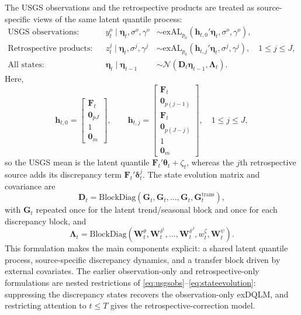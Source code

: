 \documentclass[APA,STIX1COL]{WileyNJD-v2}
\begin{document}
The USGS observations and the retrospective products are treated as source-specific views of the same latent quantile process:
\begin{align}
     \text{USGS observations}:&& y^o_t \mid \boldsymbol{\eta}_t, \sigma^o, \gamma^o &\sim \text{exAL}_{p_0}\!\left(\mathbf{h}_{t,0}' \boldsymbol{\eta}_t, \sigma^o, \gamma^o\right), \label{eq:usgsobs} \\
    \text{Retrospective products}:&& z^j_t \mid \boldsymbol{\eta}_t, \sigma^j, \gamma^j &\sim \text{exAL}_{p_0}\!\left(\mathbf{h}_{t,j}' \boldsymbol{\eta}_t, \sigma^j, \gamma^j\right), \quad 1 \leq j \leq J, \label{eq:retroobs} \\
    \text{All states}:&& \boldsymbol{\eta}_t \mid \boldsymbol{\eta}_{t-1} &\sim \mathcal{N}\!\left(\boldsymbol{D}_t \boldsymbol{\eta}_{t-1}, \boldsymbol{\Lambda}_t\right). \label{eq:stateevolution}
\end{align}
Here,
\[
\mathbf{h}_{t,0} =
\begin{bmatrix}
\mathbf{F}_t \\
\mathbf{0}_{pJ} \\
1 \\
\mathbf{0}_m
\end{bmatrix},
\qquad
\mathbf{h}_{t,j} =
\begin{bmatrix}
\mathbf{F}_t \\
\mathbf{0}_{p(j-1)} \\
\mathbf{F}_t \\
\mathbf{0}_{p(J-j)} \\
1 \\
\mathbf{0}_m
\end{bmatrix},
\quad 1 \le j \le J,
\]
so the USGS mean is the latent quantile \(\mathbf{F}_t' \boldsymbol{\theta}_t + \zeta_t\), whereas the \(j\)th retrospective source adds its discrepancy term \(\mathbf{F}_t' \boldsymbol{\delta}_t^j\). The state evolution matrix and covariance are
\[
\boldsymbol{D}_t = \text{BlockDiag}\!\left(\mathbf{G}_t, \mathbf{G}_t, \ldots, \mathbf{G}_t, \mathbf{G}^{\text{trans}}_t\right),
\]
with \(\mathbf{G}_t\) repeated once for the latent trend/seasonal block and once for each discrepancy block, and
\[
\boldsymbol{\Lambda}_t = \text{BlockDiag}\!\left(\mathbf{W}^{\theta}_t, \mathbf{W}^{\delta^1}_t, \ldots, \mathbf{W}^{\delta^J}_t, w_t^{\zeta}, \mathbf{W}^{\psi}_t\right).
\]
This formulation makes the main components explicit: a shared latent quantile process, source-specific discrepancy dynamics, and a transfer block driven by external covariates. The earlier observation-only and retrospective-only formulations are nested restrictions of \eqref{eq:usgsobs}--\eqref{eq:stateevolution}: suppressing the discrepancy states recovers the observation-only exDQLM, and restricting attention to \(t \leq T\) gives the retrospective-correction model.
\end{document}
